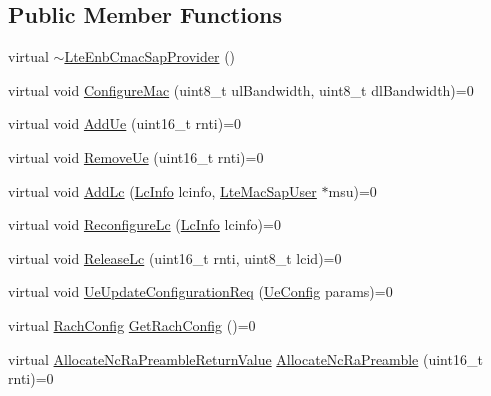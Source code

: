 \subsection*{Public Member Functions}
\begin{DoxyCompactItemize}
\item 
virtual \hyperlink{classns3_1_1LteEnbCmacSapProvider_a46c1a52b1862c8255b11bd9f291a5d1d}{$\sim$\+Lte\+Enb\+Cmac\+Sap\+Provider} ()
\item 
virtual void \hyperlink{classns3_1_1LteEnbCmacSapProvider_a1ccf46d97c84b8fde9df20f6cd2aa6b8}{Configure\+Mac} (uint8\+\_\+t ul\+Bandwidth, uint8\+\_\+t dl\+Bandwidth)=0
\item 
virtual void \hyperlink{classns3_1_1LteEnbCmacSapProvider_a5980d204af75d00469bfc48e265550f1}{Add\+Ue} (uint16\+\_\+t rnti)=0
\item 
virtual void \hyperlink{classns3_1_1LteEnbCmacSapProvider_aad910503052260849718b3d652d163f9}{Remove\+Ue} (uint16\+\_\+t rnti)=0
\item 
virtual void \hyperlink{classns3_1_1LteEnbCmacSapProvider_a3b503827c534ee4c5a18c1650341ca97}{Add\+Lc} (\hyperlink{structns3_1_1LteEnbCmacSapProvider_1_1LcInfo}{Lc\+Info} lcinfo, \hyperlink{classns3_1_1LteMacSapUser}{Lte\+Mac\+Sap\+User} $\ast$msu)=0
\item 
virtual void \hyperlink{classns3_1_1LteEnbCmacSapProvider_abd484290938c9ed7138cadec715c838d}{Reconfigure\+Lc} (\hyperlink{structns3_1_1LteEnbCmacSapProvider_1_1LcInfo}{Lc\+Info} lcinfo)=0
\item 
virtual void \hyperlink{classns3_1_1LteEnbCmacSapProvider_a152660a7c53cb40f1203753b16b996f3}{Release\+Lc} (uint16\+\_\+t rnti, uint8\+\_\+t lcid)=0
\item 
virtual void \hyperlink{classns3_1_1LteEnbCmacSapProvider_a4042e108966a3b54f808968df7518d23}{Ue\+Update\+Configuration\+Req} (\hyperlink{structns3_1_1LteEnbCmacSapProvider_1_1UeConfig}{Ue\+Config} params)=0
\item 
virtual \hyperlink{structns3_1_1LteEnbCmacSapProvider_1_1RachConfig}{Rach\+Config} \hyperlink{classns3_1_1LteEnbCmacSapProvider_a12632261a38a19676a1853bba76cea24}{Get\+Rach\+Config} ()=0
\item 
virtual \hyperlink{structns3_1_1LteEnbCmacSapProvider_1_1AllocateNcRaPreambleReturnValue}{Allocate\+Nc\+Ra\+Preamble\+Return\+Value} \hyperlink{classns3_1_1LteEnbCmacSapProvider_a6a5be04fd0a0de8a5df57625911ecd35}{Allocate\+Nc\+Ra\+Preamble} (uint16\+\_\+t rnti)=0
\end{DoxyCompactItemize}


